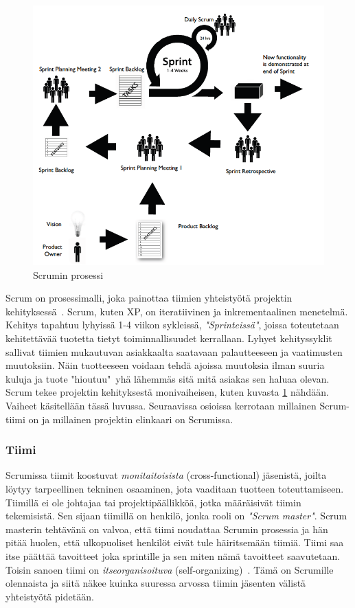 \documentclass[finnish]{../tktltiki2}
\theoremstyle{definition}
\theoremstyle{remark}
\begin{document}
\begin{figure}[ht]
     \includegraphics{scrum.png}
     \caption{Scrumin prosessi~\cite{ScrumHandBook}}\label{scrumprocess}
\end{figure}

Scrum on prosessimalli, joka painottaa tiimien yhteistyötä projektin 
kehityksessä~\cite{ScrumORG}. Scrum, kuten XP, on iteratiivinen 
ja inkrementaalinen menetelmä.
Kehitys tapahtuu lyhyissä 1-4 viikon sykleissä, 
\emph{"Sprinteissä"}, joissa toteutetaan kehitettävää tuotetta tietyt 
toiminnallisuudet kerrallaan. Lyhyet kehityssyklit sallivat tiimien 
mukautuvan asiakkaalta saatavaan palautteeseen ja vaatimusten 
muutoksiin. Näin tuotteeseen voidaan tehdä ajoissa
muutoksia ilman suuria kuluja ja tuote "hioutuu"~yhä lähemmäs sitä 
mitä asiakas sen haluaa olevan. Scrum tekee projektin kehityksestä
monivaiheisen, kuten kuvasta \ref{scrumprocess} nähdään. Vaiheet käsitellään tässä luvussa. Seuraavissa osioissa kerrotaan millainen Scrum-tiimi
on ja millainen projektin elinkaari on Scrumissa.

\subsubsection{Tiimi}

Scrumissa tiimit koostuvat \emph{monitaitoisista} (cross-functional) 
jäsenistä, joilta löytyy tarpeellinen tekninen osaaminen, jota 
vaaditaan
tuotteen toteuttamiseen. Tiimillä ei ole johtajaa tai 
projektipäällikköä, jotka määräisivät tiimin tekemisistä. Sen sijaan tiimillä on henkilö, jonka rooli on \emph{"Scrum master"}. Scrum masterin tehtävänä on valvoa, että tiimi noudattaa Scrumin prosessia ja hän pitää huolen, että ulkopuoliset henkilöt eivät tule häiritsemään tiimiä.
Tiimi saa itse päättää tavoitteet joka sprintille ja sen miten nämä tavoitteet 
saavutetaan. Toisin sanoen tiimi on \emph{itseorganisoituva}
(self-organizing)~\cite{ScrumHandBook}. Tämä on Scrumille olennaista ja siitä näkee 
kuinka suuressa arvossa tiimin jäsenten välistä yhteistyötä 
pidetään.
\end{document}
